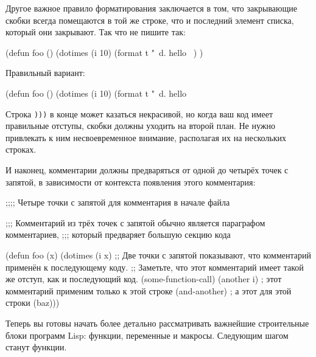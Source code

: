 Другое важное правило форматирования заключается в том, что закрывающие скобки всегда
помещаются в той же строке, что и последний элемент списка, который они закрывают. Так что
не пишите так:

\begin{myverb}
(defun foo ()
  (dotimes (i 10)
    (format t "~d. hello~%
  )
)
\end{myverb}

\noindent{}Правильный вариант:

\begin{myverb}
(defun foo ()
  (dotimes (i 10)
    (format t "~d. hello~%
\end{myverb}

Строка \lstinline{)))} в конце может казаться некрасивой, но когда ваш код имеет правильные
отступы, скобки должны уходить на второй план. Не нужно привлекать к ним несвоевременное
внимание, располагая их на нескольких строках.

И наконец, комментарии должны предваряться от одной до четырёх точек с запятой, в
зависимости от контекста появления этого комментария:

\begin{myverb}
;;;; Четыре точки с запятой для комментария в начале файла

;;; Комментарий из трёх точек с запятой обычно является параграфом комментариев,
;;; который предваряет большую секцию кода

(defun foo (x)
  (dotimes (i x)
    ;; Две точки с запятой показывают, что комментарий применён к последующему коду.
    ;; Заметьте, что этот комментарий имеет такой же отступ, как и последующий код.
    (some-function-call)
    (another i)              ; этот комментарий применим только к этой строке
    (and-another)            ; а этот для этой строки
    (baz)))
\end{myverb}

Теперь вы готовы начать более детально рассматривать важнейшие строительные блоки программ
Lisp: функции, переменные и макросы. Следующим шагом станут функции.

